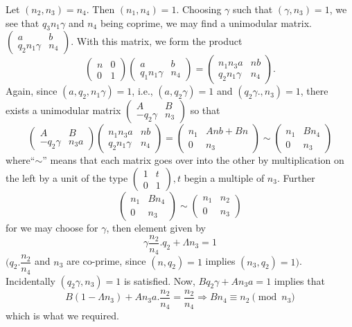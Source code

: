 Let $(n_2, n_3) = n_4$. Then $(n_1, n_4) = 1 $. Choosing $\gamma$ such
that $(\gamma,  n_3 ) = 1$, we see that $q_3 n_1 \gamma$ and $ n_4$
being coprime, we may find a unimodular matrix. $\begin{pmatrix} a & b
  \\ q_2 n_1 \gamma  & n_4 \end{pmatrix}$. With this matrix, we form
the product  
$$
\begin{pmatrix} n & 0 \\ 0 & 1 \end{pmatrix} \begin{pmatrix} a & b
  \\q_1 n_1 \gamma & n_4 \end{pmatrix} = \begin{pmatrix} n_1 n_3 a  &
  nb \\ q_2 n_1 \gamma  & n_4 \end{pmatrix}. 
$$
Again,  since $(a,  q_2,  n_1 \gamma) = 1$, i.e., $(a, q_2 \gamma) =
1$ and $(q_2 \gamma.,  n_3) = 1$, there exists a unimodular matrix
$\begin{pmatrix} A & B \\ -q_2 \gamma  & n_3   \end{pmatrix}$ so that  
$$
\begin{pmatrix} A & B \\ -q_2 \gamma  & n_3
  a  \end{pmatrix} \begin{pmatrix} n_1 n_3 a  & nb \\ q_2 n_1 \gamma
  & n_4 \end{pmatrix} = \begin{pmatrix} n_1  & Anb + Bn \\ 0 &
  n_3 \end{pmatrix} \sim \begin{pmatrix} n_1  &Bn_4 \\ 0 &
  n_3 \end{pmatrix} 
$$
where\pageoriginale ``$\sim $'' means that each matrix goes over into the other by
multiplication on the left by a unit of the type $\begin{pmatrix} 1 &
  t \\ 0 & 1 \end{pmatrix}, t$ begin a multiple of $n_3$. Further  
$$
\begin{pmatrix}
  n_1 & Bn_4 \\
  0 & n_3 
\end{pmatrix}
\sim 
\begin{pmatrix}
  n_1 & n_2\\
  0 & n_3
\end{pmatrix}
$$
for we may choose for $\gamma$, then element given by
$$
\gamma \frac{n_2}{n_4}. q_2 + \Lambda n_3 = 1
$$
$(q_2. \dfrac{n_2}{n_4}$ and $n_3$ are co-prime, since $(n, q_2) = 1$
implies $(n_3, q_2) = 1)$. Incidentally $(q_2 \gamma, n_3) = 1$ is
satisfied. Now, $B q_2 \gamma + An_3 a = 1$ implies that 
$$
B(1- \Lambda n_3) + An_3 a. \frac{n_2}{n_4} = \frac{n_2}{n_4}
\Rightarrow B n_4 \equiv n_2 \pmod{n_3} 
$$
which is what we required.

